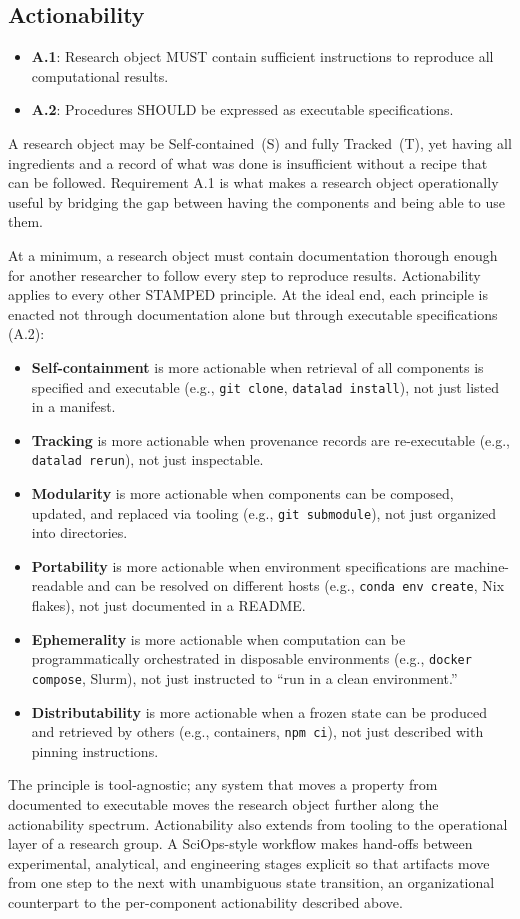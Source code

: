 \documentclass{article}
\makeatletter
\newcommand{\hyanchor}[1]{\texorpdfstring{\Hy@raisedlink{\hypertarget{#1}{}}}{}}
\newcommand{\anchoredsubsection}[2]{\subsection[#2]{\hyanchor{#1}#2}}
\makeatother
\begin{document}
\anchoredsubsection{actionability}{Actionability}

\begin{itemize}
    \item \textbf{A.1}: Research object MUST contain sufficient instructions to reproduce all computational results.
    \item \textbf{A.2}: Procedures SHOULD be expressed as executable specifications.
\end{itemize}

A research object may be Self-contained~(S) and fully Tracked~(T), yet having all ingredients and a record of what was done is insufficient without a recipe that can be followed.
Requirement A.1 is what makes a research object operationally useful by bridging the gap between having the components and being able to use them.

At a minimum, a research object must contain documentation thorough enough for another researcher to follow every step to reproduce results.
Actionability applies to every other STAMPED principle.
At the ideal end, each principle is enacted not through documentation alone but through executable specifications (A.2):
\begin{itemize}
  \item \textbf{Self-containment} is more actionable when retrieval of all components is specified and executable (e.g., \texttt{git clone}, \texttt{datalad install}), not just listed in a manifest.
  \item \textbf{Tracking} is more actionable when provenance records are re-executable (e.g., \texttt{datalad rerun}), not just inspectable.
  \item \textbf{Modularity} is more actionable when components can be composed, updated, and replaced via tooling (e.g., \texttt{git submodule}), not just organized into directories.
  \item \textbf{Portability} is more actionable when environment specifications are machine-readable and can be resolved on different hosts (e.g., \texttt{conda env create}, Nix flakes), not just documented in a README.
  \item \textbf{Ephemerality} is more actionable when computation can be programmatically orchestrated in disposable environments (e.g., \texttt{docker compose}, Slurm), not just instructed to ``run in a clean environment.''
  \item \textbf{Distributability} is more actionable when a frozen state can be produced and retrieved by others (e.g., containers, \texttt{npm ci}), not just described with pinning instructions.
\end{itemize}
The principle is tool-agnostic; any system that moves a property from documented to executable moves the research object further along the actionability spectrum.
Actionability also extends from tooling to the operational layer of a research group.
A SciOps-style workflow makes hand-offs between experimental, analytical, and engineering stages explicit so that artifacts move from one step to the next with unambiguous state transition\cite{johnson_sciops_2024}, an organizational counterpart to the per-component actionability described above.
\end{document}
